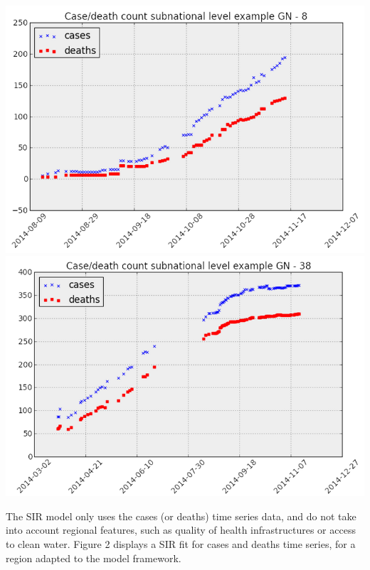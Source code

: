 \documentclass[twoside]{article}
\begin{document}
\begingroup
\centering
\includegraphics[scale=0.2]{./img/high_fit_cases.png}
\includegraphics[scale=0.2]{./img/low_fit_case.png}
\endgroup
\vspace{.2 in}

The SIR model only uses the cases (or deaths) time series data, and do not take into account regional features, such as quality of health infrastructures or access to clean water. Figure 2 displays a SIR fit for cases and deaths time series, for a region adapted to the model framework.
\end{document}
